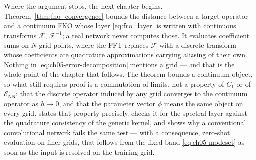 
\medskip
Where the argument stops, the next chapter begins.
Theorem~\ref{thm:fno_convergence} bounds the distance between a target operator
and a continuum FNO whose layer \eqref{eq:fno_layer} is written with continuous
transforms $\mathcal{F}$, $\mathcal{F}^{-1}$; a real network never computes
those. It evaluates coefficient sums on $N$ grid points, where the FFT replaces
$\mathcal{F}$ with a discrete transform whose coefficients are quadrature
approximations carrying aliasing of their own. Nothing in
\eqref{eq:ch05-error-decomposition} mentions a grid --- and that is the whole
point of the chapter that follows. The theorem bounds a continuum object, so
what still requires proof is a commutation of limits, not a property of $C_1$
or of $\mathcal{E}_{\text{NN}}$: that the discrete operator induced by any grid
converges to the continuum operator as $h \to 0$, and that the parameter vector
$\phi$ means the same object on every grid.  states that
property precisely, checks it for the spectral layer against the quadrature
consistency of the generic kernel, and shows why a conventional convolutional
network fails the same test --- with a consequence, zero-shot evaluation on
finer grids, that follows from the fixed band \eqref{eq:ch05-modeset} as soon as
the input is resolved on the training grid.
